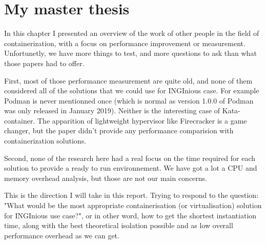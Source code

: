 \section{My master thesis}
In this chapter I presented an overview of the work of other people in the field of containerization, with a focus on performance improvement or measurement.  Unfortunetly, we have more things to test, and more questions to ask than what those papers had to offer.

First, most of those performance measurement are quite old, and none of them considered all of the solutions that we could use for INGInious case.  For example Podman is never mentionned once (which is normal as version 1.0.0 of Podman was only released in January 2019).  Neither is the interesting case of Kata-container.  The apparition of lightweight hypervisor like Firecracker is a game changer, but the paper didn't provide any performance comparision with containerization solutions.

Second, none of the research here had a real focus on the time required for each solution to provide a ready to run environnement.  We have got a lot a CPU and memory overhead analysis, but those are not our main concerns.

This is the direction I will take in this report.  Trying to respond to the question: "What would be the most appropriate containerisation (or virtualisation) solution for INGInious use case?", or in other word, how to get the shortest instantiation time, along with the best theoretical isolation possible and as low overall performance overhead as we can get.
